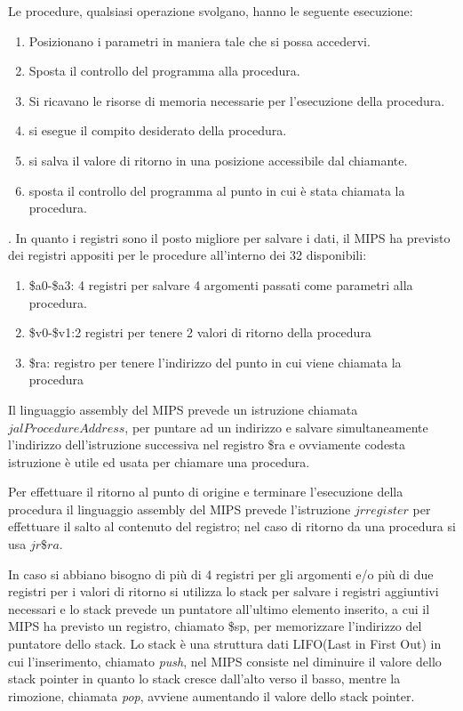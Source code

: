 Le procedure, qualsiasi operazione svolgano, hanno le seguente esecuzione:
\begin{enumerate}
  \item Posizionano i parametri in maniera tale che si possa accedervi.
  \item Sposta il controllo del programma alla procedura.
  \item Si ricavano le risorse di memoria necessarie per l'esecuzione della procedura.
  \item si esegue il compito desiderato della procedura.
  \item si salva il valore di ritorno in una posizione accessibile dal chiamante.
  \item sposta il controllo del programma al punto in cui è stata chiamata la procedura.
\end{enumerate}.
In quanto i registri sono il posto migliore per salvare i dati, il MIPS ha previsto
dei registri appositi per le procedure all'interno dei 32 disponibili:
\begin{enumerate}
  \item \$a0-\$a3: 4 registri per salvare 4 argomenti passati come parametri alla procedura.
  \item \$v0-\$v1:2 registri per tenere 2 valori di ritorno della procedura
  \item \$ra: registro per tenere l'indirizzo del punto in cui viene chiamata la procedura
\end{enumerate}
Il linguaggio assembly del MIPS prevede un istruzione chiamata $jal ProcedureAddress$,
per puntare ad un indirizzo e salvare simultaneamente l'indirizzo dell'istruzione successiva nel registro \$ra
e ovviamente codesta istruzione è utile ed usata per chiamare una procedura.

Per effettuare il ritorno al punto di origine e terminare l'esecuzione della procedura
il linguaggio assembly del MIPS prevede l'istruzione $jr register$ per effettuare
il salto al contenuto del registro; nel caso di ritorno da una procedura si usa $jr \$ra$.

In caso si abbiano bisogno di più di 4 registri per gli argomenti e/o più di due registri
per i valori di ritorno si utilizza lo stack per salvare i registri aggiuntivi necessari
e lo stack prevede un puntatore all'ultimo elemento inserito, a cui il MIPS ha previsto
un registro, chiamato \$sp, per memorizzare l'indirizzo del puntatore dello stack.
Lo stack è una struttura dati LIFO(Last in First Out) in cui l'inserimento, chiamato \emph{push},
nel MIPS consiste nel diminuire il valore dello stack pointer in quanto lo stack cresce dall'alto verso il basso,
mentre la rimozione, chiamata \emph{pop}, avviene aumentando il valore dello stack pointer.


